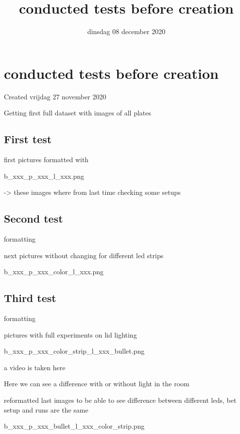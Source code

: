 \documentclass{scrartcl}
\title{conducted tests before creation}
\date{dinsdag 08 december 2020}
\author{}
\begin{document}
\maketitle

		\section{conducted tests before creation}

Created vrijdag 27 november 2020



Getting first full dataset with images of all plates



\subsection{First test}

first pictures formatted with 

b\_xxx\_p\_xxx\_l\_xxx.png

	-\textgreater{} these images where from last time checking some setups
	
	



\subsection{Second test}

formatting 

next pictures without changing for different led strips

b\_xxx\_p\_xxx\_color\_l\_xxx.png



\subsection{Third test}

formatting

pictures with full experiments on lid lighting

b\_xxx\_p\_xxx\_color\_strip\_l\_xxx\_bullet.png

a video is taken here 

Here we can see a difference with or without light in the room



reformatted last images to be able to see difference between different leds, bet setup and runs are the same

b\_xxx\_p\_xxx\_bullet\_l\_xxx\_color\_strip.png
\end{document}
